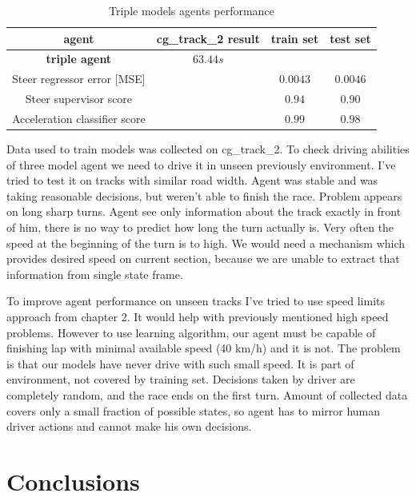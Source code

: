\documentclass[declaration,shortabstract,english,inz]{iithesis}
\begin{document}
 \begin{table}[h]
    \centering
    \begin{tabular}{ |c|c|c|c|}
          \hline
          agent & cg\_track\_2 result& train set & test set \\
          \hline
          \textbf{triple agent} & $63.44s$ &   &  \\
          \hline
          Steer regressor error [MSE]&   & $0.0043$ & $0.0046$\\
          \hline
          Steer supervisor score & & $0.94$ & $0.90$ \\
          \hline
          Acceleration classifier score &  & $0.99$ & $0.98$ \\
          \hline       
        \end{tabular}
        \caption{Triple models agents performance}
        \label{tab:triple_models_results}

\end{table}

Data used to train models was collected on cg\_track\_2.
To check driving abilities of three model agent we need to drive it in unseen previously environment.
I've tried to test it on tracks with similar road width.
Agent was stable and was taking reasonable decisions, but weren't able to finish the race.
Problem appears on long sharp turns.
Agent see only information about the track exactly in front of him, there is no way to predict how long the turn actually is.
Very often the speed at the beginning of the turn is to high.
We would need a mechanism which provides desired speed on current section, because we are unable to extract that information from single state frame.

To improve agent performance on unseen tracks I've tried to use speed limits approach from chapter 2.
It would help with previously mentioned high speed problems.
However to use learning algorithm, our agent must be capable of finishing lap with minimal available speed (40 km/h) and it is not.
The problem is that our models have never drive with such small speed.
It is part of environment, not covered by training set.
Decisions taken by driver are completely random, and the race ends on the first turn.
Amount of collected data covers only a small fraction of possible states, so agent has to mirror human driver actions and cannot make his own decisions.


\chapter{Conclusions}
\end{document}
